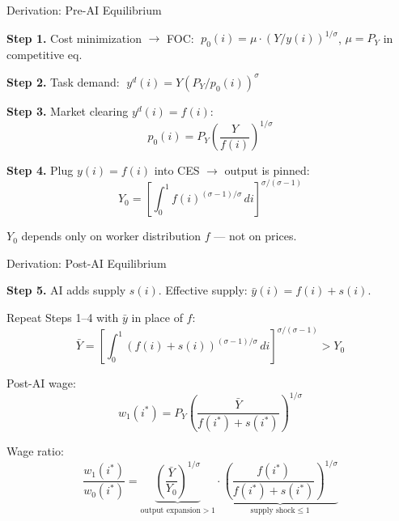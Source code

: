 \documentclass[aspectratio=169]{beamer}
\begin{document}
\begin{frame}{Derivation: Pre-AI Equilibrium}

\textbf{Step 1.} Cost minimization $\rightarrow$ FOC:
$\;p_0(i)=\mu\cdot(Y/y(i))^{1/\sigma}$, \quad $\mu=P_Y$ in competitive eq.

\medskip
\textbf{Step 2.} Task demand: $\;y^d(i)=Y(P_Y/p_0(i))^{\sigma}$

\medskip
\textbf{Step 3.} Market clearing $y^d(i)=f(i)$:
\[
  p_0(i) = P_Y\!\left(\frac{Y}{f(i)}\right)^{\!1/\sigma}
\]

\textbf{Step 4.} Plug $y(i)=f(i)$ into CES $\rightarrow$ output is pinned:
\[
  \boxed{Y_0 = \left[\int_0^1 f(i)^{(\sigma-1)/\sigma}\,di
  \right]^{\!\sigma/(\sigma-1)}}
\]

$Y_0$ depends only on worker distribution $f$ --- not on prices.

\end{frame}

\begin{frame}{Derivation: Post-AI Equilibrium}

\textbf{Step 5.} AI adds supply $s(i)$. Effective supply:
$\bar y(i)=f(i)+s(i)$.

\medskip
Repeat Steps 1--4 with $\bar y$ in place of $f$:
\[
  \bar Y = \left[\int_0^1 (f(i)+s(i))^{(\sigma-1)/\sigma}\,di
  \right]^{\!\sigma/(\sigma-1)} > Y_0
\]

Post-AI wage:
\[
  \boxed{w_1(i^*) = P_Y\!\left(\frac{\bar Y}{f(i^*)+s(i^*)}\right)^{\!1/\sigma}}
\]

\medskip
Wage ratio:
\[
  \frac{w_1(i^*)}{w_0(i^*)}
  = \underbrace{\left(\frac{\bar Y}{Y_0}\right)^{\!1/\sigma}}_{\text{output expansion}>1}
  \cdot
  \underbrace{\left(\frac{f(i^*)}{f(i^*)+s(i^*)}\right)^{\!1/\sigma}}_{\text{supply shock}\leq 1}
\]

\end{frame}
\end{document}
